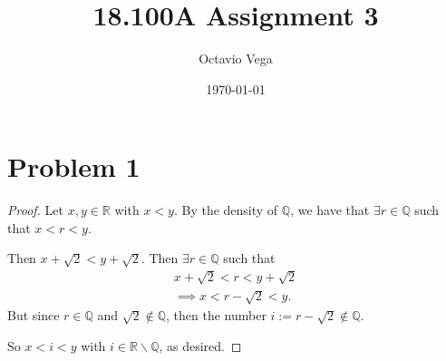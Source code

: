 \documentclass{article}
\title{18.100A Assignment 3}
\author{Octavio Vega}
\date\today
\begin{document}
\maketitle
	
\section*{Problem 1}
\begin{proof}
	Let $x,y \in \mathbb{R}$ with $x<y$. By the density of $\mathbb{Q}$, we have that $\exists r \in \mathbb{Q}$ such that $x<r<y$. 
	
	Then $x+\sqrt{2} < y + \sqrt{2}$. Then $\exists r \in \mathbb{Q}$ such that
	\begin{align}
		x + \sqrt{2} < r < y + \sqrt{2} \\
		\implies x < r - \sqrt{2} < y.
	\end{align}
	But since $r \in \mathbb{Q}$ and $\sqrt{2} \notin \mathbb{Q}$, then the number $i := r-\sqrt{2} \notin \mathbb{Q}$.
	
	So $x<i<y$ with $i \in \mathbb{R} \backslash \mathbb{Q}$, as desired.
\end{proof}
\end{document}

